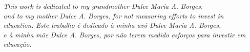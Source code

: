 


\begin{dedicatoria}

  \vspace*{\fill}
  \centering
  \noindent
  \textit{\lang
    {
      This work is dedicated to my grandmother Dulce Maria A. Borges, \\
      and to my mother Dulce A. Borges, for not measuring efforts
      to invest in education.
    }
    {
      Este trabalho é dedicado à minha avó Dulce Maria A. Borges,\\
      e à minha mãe Dulce A. Borges, por não terem medido esforços para
      investir em educação.
    }
  }
  \vspace*{\fill}

\end{dedicatoria}


